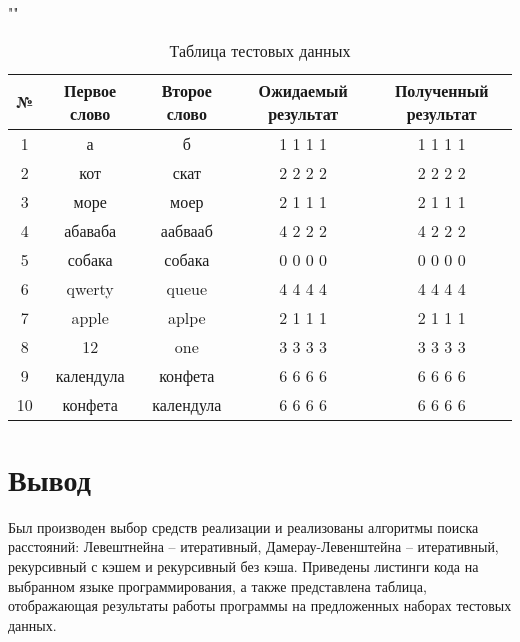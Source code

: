 \begin{table}[h]
\renewcommand{\arraystretch}{1.8}
\renewcommand{\tabcolsep}{0.1cm} 
	\begin{center}
		
		\caption{Таблица тестовых данных}
		""\newline
		\begin{tabular}{|c c c c c| } 
			\hline
			№ & Первое слово & Второе слово & Ожидаемый результат & Полученный результат \\ [0.8ex] 
			\hline
			1 & а & б & 1 1 1 1 & 1 1 1 1\\
			\hline
			2 & кот & скат & 2 2 2 2 & 2 2 2 2\\
			\hline
			3 & море & моер & 2 1 1 1 & 2 1 1 1\\
			\hline
			4 & абаваба & аабвааб & 4 2 2 2 & 4 2 2 2\\
			\hline
			5 & собака & собака & 0 0 0 0 & 0 0 0 0\\
			\hline
			6 & qwerty & queue & 4 4 4 4 & 4 4 4 4\\
			\hline
			7 & apple & aplpe & 2 1 1 1  & 2 1 1 1\\
			\hline
			8 & 12 & one & 3 3 3 3 & 3 3 3 3\\
			\hline
			9 & календула & конфета & 6 6 6 6 & 6 6 6 6\\
			\hline
			10 & конфета & календула & 6 6 6 6 & 6 6 6 6\\
			\hline
		\end{tabular}
	\end{center}
\end{table}


\section*{Вывод}

Был производен выбор средств реализации и реализованы алгоритмы поиска расстояний: Левештнейна -- итеративный, Дамерау-Левенштейна -- итеративный, рекурсивный с кэшем и рекурсивный без кэша.
Приведены листинги кода на выбранном языке программирования, а также представлена таблица, отображающая результаты работы программы на предложенных наборах тестовых данных.
